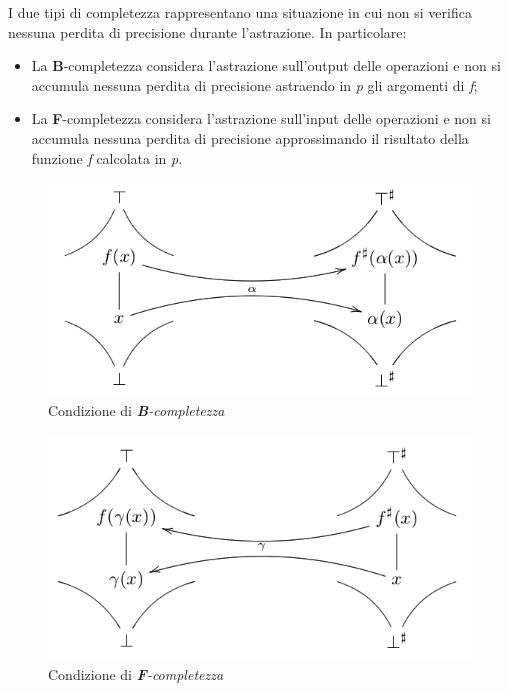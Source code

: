 \documentclass[a4paper, 10pt]{book}
\begin{document}
	I due tipi di completezza rappresentano una situazione in cui non si verifica nessuna perdita di precisione durante l'astrazione. In particolare:
	\begin{itemize}
		\item La \textbf{B}-completezza considera l'astrazione sull'output delle operazioni e non si accumula nessuna perdita di precisione astraendo in \textit{p} gli argomenti di \textit{f};
		\item La \textbf{F}-completezza considera l'astrazione sull'input delle operazioni e non si accumula nessuna perdita di precisione approssimando il risultato della funzione \textit{f} calcolata in \textit{p}.
	\end{itemize}
	
	\begin{multicols}{2}	
		\begin{figure}[H]
			\centering
			\includegraphics[scale=0.33]{pngs/Backward}
			\caption{Condizione di \textit{\textbf{B}-completezza}}
			\label{Backward}
		\end{figure}
		\columnbreak
		\begin{figure}[H]
			\centering
			\includegraphics[scale=0.33]{pngs/Forward}
			\caption{Condizione di \textit{\textbf{F}-completezza}}
			\label{Forward}
		\end{figure}
	\end{multicols}
\end{document}
